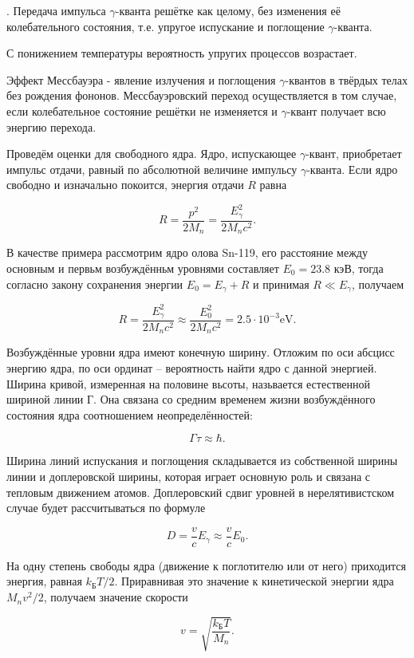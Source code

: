 \documentclass[a4paper,12pt]{article} %
\begin{document}
. Передача импульса $\gamma$-кванта решётке как целому, без изменения её колебательного состояния, т.е. упругое испускание и поглощение $\gamma$-кванта.


\noindent С понижением температуры вероятность упругих процессов возрастает.


\noindent Эффект Мессбауэра - явление излучения и поглощения $\gamma$-квантов в твёрдых телах без рождения фононов. Мессбауэровский переход осуществляется в том случае, если колебательное состояние решётки не изменяется и $\gamma$-квант получает всю энергию перехода.


\noindent Проведём оценки для свободного ядра. Ядро, испускающее $\gamma$-квант, приобретает импульс отдачи, равный по абсолютной величине импульсу $\gamma$-кванта. Если ядро свободно и изначально покоится, энергия отдачи $R$ равна

$$
R=\frac{p^2}{2M_n} = \frac{E_{\gamma}^2}{2M_nc^2}.
$$

\noindent В качестве примера рассмотрим ядро олова Sn-119, его расстояние между основным и первьм возбуждённьм уровнями составляет $E_{0}=23.8$ кэВ, тогда согласно закону сохранения энергии $E_{0}=E_{\gamma}+R$ и принимая $R \ll E_{\gamma}$, получаем

$$
R=\frac{E_{\gamma}^{2}}{2 M_{n} c^{2}} \approx \frac{E_{0}^{2}}{2 M_{n} c^{2}}=2.5 \cdot 10^{-3} \mathrm{ eV.}
$$

\noindent Возбуждённые уровни ядра имеют конечную ширину. Отложим по оси абсцисс энергию ядра, по оси ординат -- вероятность найти ядро с данной энергией. Ширина кривой, измеренная на половине вьсоты, назьвается естественной шириной линии Г. Она связана со средним временем жизни возбуждённого состояния ядра соотношением
неопределённостей:

$$
\Gamma \tau \approx \hbar.
$$

\noindent Ширина линий испускания и поглощения складывается из собственной ширины линии и доплеровской ширины, которая играет основную роль и связана с тепловым движением атомов. Доплеровский сдвиг уровней в нерелятивистском случае будет рассчитываться по формуле

$$
D = \frac{v}{c} E_{\gamma} \approx \frac{v}{c} E_0.
$$

\noindent На одну степень свободы ядра (движение к поглотителю или от него) приходится энергия, равная $k_\text{Б}T/2$. Приравнивая это значение к кинетической энергии ядра $M_nv^2/2$, получаем значение скорости

$$
v = \sqrt{\frac{k_{\text{Б}}T}{M_n}}.
$$
\end{document}
